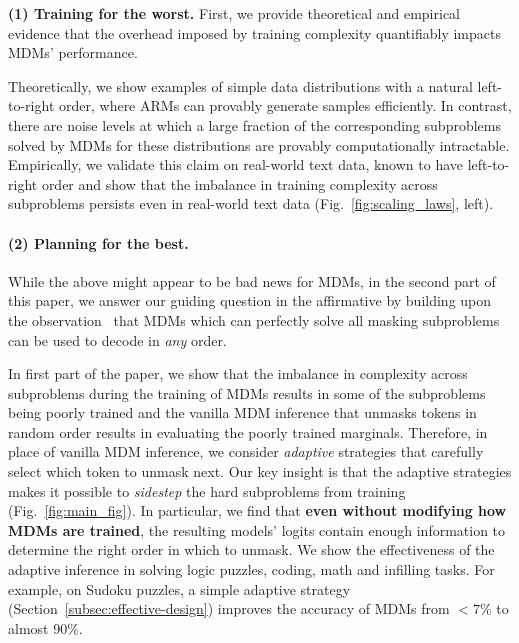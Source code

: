 \documentclass{article}
\theoremstyle{plain}
\theoremstyle{definition}
\theoremstyle{remark}
\newcounter{theo}
\begin{document}
\textbf{(1) Training for the worst.} \enspace First, we provide theoretical and empirical evidence that the overhead imposed by training complexity quantifiably impacts MDMs' performance. 

Theoretically, we show examples of simple data distributions with a natural left-to-right order, where ARMs can provably generate samples efficiently. In contrast, there are noise levels at which a large fraction of the corresponding subproblems solved by MDMs for these distributions are provably computationally intractable. Empirically, we validate this claim on real-world text data, known to have left-to-right order and show that the imbalance in training complexity across subproblems persists even in real-world text data (Fig.~\ref{fig:scaling_laws}, left). 

\paragraph{(2) Planning for the best.} While the above might appear to be bad news for MDMs, in the second part of this paper, we answer our guiding question in the affirmative by building upon the observation~\cite{chang2022maskgit, zheng2024reparameterized} that MDMs which can perfectly solve all masking subproblems can be used to decode in \emph{any} order.

In first part of the paper, we show that the imbalance in complexity across subproblems during the training of MDMs results in some of the subproblems being poorly trained and the vanilla MDM inference that unmasks tokens in random order results in evaluating the poorly trained marginals. Therefore, in place of vanilla MDM inference, we consider \emph{adaptive} strategies that carefully select which token to unmask next. 
Our key insight is that the adaptive strategies makes it possible to \emph{sidestep} the hard subproblems from training (Fig.~\ref{fig:main_fig}). In particular, we find that \textbf{even without modifying how MDMs are trained}, the resulting models' logits contain enough information to determine the right order in which to unmask. We show the effectiveness of the adaptive inference in solving logic puzzles, coding, math and infilling tasks. For example, on Sudoku puzzles, a simple adaptive strategy (Section~\ref{subsec:effective-design}) improves the accuracy of MDMs from $<7$\% to almost 90\%.
\end{document}
